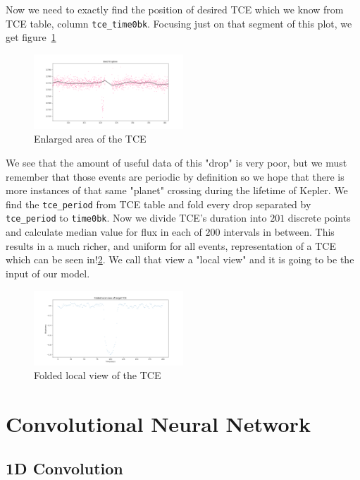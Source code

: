 \documentclass[twoside]{article}
\newcommand{\code}[1]{\texttt{#1}}
\begin{document}
\begin{multicols}{2}
Now we need to exactly find the position of desired TCE which we know from TCE table, column \code{tce\_time0bk}. Focusing just on that segment of this plot, we get figure~\ref{fig:enlarged_tce}
\begin{figure}[H]
\includegraphics[width=0.5\textwidth]{splinezoomLC-9517393}
\caption{Enlarged area of the TCE}
\label{fig:enlarged_tce}
\end{figure}

We see that the amount of useful data of this "drop" is very poor, but we must remember that those events are periodic by definition so we hope that there is more instances of that same "planet" crossing during the lifetime of Kepler. We find the \code{tce\_period} from TCE table and fold every drop separated by \code{tce\_period} to \code{time0bk}. Now we divide TCE's duration into $201$ discrete points and calculate median value for flux in each of $200$ intervals in between. This results in a much richer, and uniform for all events, representation of a TCE which can be seen in!\ref{fig:folded_tce}. We call that view a "local view" and it is going to be the input of our model.
\begin{figure}[H]
\includegraphics[width=0.5\textwidth]{localvierLCdrop-9517393}
\caption{Folded local view of the TCE}
\label{fig:folded_tce}
\end{figure}

\section{Convolutional Neural Network}


\subsection{1D Convolution}


\end{multicols}
\end{document}
